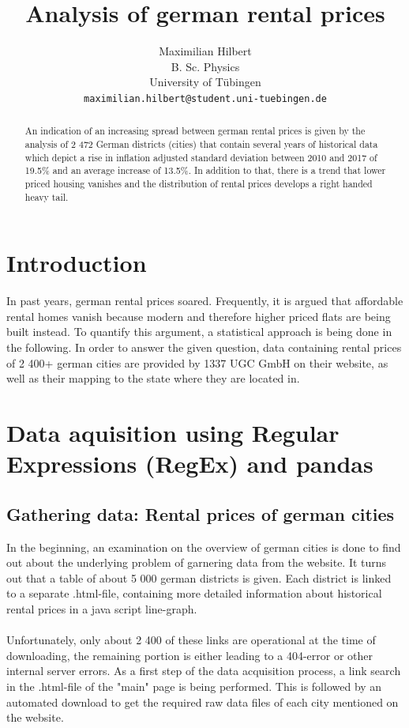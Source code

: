 \documentclass{article}
\title{Analysis of german rental prices}
\author{%
  Maximilian Hilbert \\
  B. Sc. Physics\\
  University of Tübingen\\
  \texttt{maximilian.hilbert@student.uni-tuebingen.de}
}
\begin{document}
	\maketitle
\begin{abstract}
		An indication of an increasing spread between german rental prices is given by the analysis of 2 472 German districts (cities) that contain several years of historical data which depict a rise in inflation adjusted standard deviation between 2010 and 2017 of 19.5\% and an average increase of 13.5\%. In addition to that, there is a trend that lower priced housing vanishes and the distribution of rental prices develops a right handed heavy tail.
\end{abstract}

\section{Introduction}
	In past years, german rental prices soared. Frequently, it is argued that affordable rental homes vanish because modern and therefore higher priced flats are being built instead. To quantify this argument, a statistical approach is being done in the following. In order to answer the given question, data containing rental prices of 2 400+ german cities are provided by 1337 UGC GmbH on their website, as well as their mapping to the state where they are located in. \cite{rental_prices_city,rental_prices_states}
	
\section{Data aquisition using Regular Expressions (RegEx) and pandas}
\subsection{Gathering data: Rental prices of german cities}

	In the beginning, an examination on the overview of german cities \cite{rental_prices_city} is done to find out about the underlying problem of garnering data from the website. It turns out that a table of about 5 000 german districts is given. Each district is linked to a separate .html-file, containing more detailed information about historical rental prices in a java script line-graph. \\
	\\Unfortunately, only about 2 400 of these links are operational at the time of downloading, the remaining portion is either leading to a 404-error or other internal server errors. As a first step of the data acquisition process, a link search in the .html-file of the "main" page is being performed. This is followed by an automated download to get the required raw data files of each city mentioned on the website.
    
\end{document}
